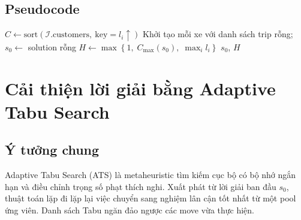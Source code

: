 \documentclass[../DoAn.tex]{subfiles}
\begin{document}
\subsection{Pseudocode}

\begin{algorithm}[H]
\caption{Greedy Insertion --- Xây dựng lời giải ban đầu}
\label{alg:greedy}
$C \leftarrow \mathrm{sort}(\mathcal{I}.\mathrm{customers},\ \mathrm{key} = l_i \uparrow)$\;
Khởi tạo mỗi xe với danh sách trip rỗng; $s_0 \leftarrow$ solution rỗng\;
$H \leftarrow \max\!\left\{1,\; C_{\max}(s_0),\; \max_i l_i\right\}$\;
\Return $s_0$, $H$\;
\end{algorithm}

\section{Cải thiện lời giải bằng Adaptive Tabu Search}

\subsection{Ý tưởng chung}

Adaptive Tabu Search (ATS) là metaheuristic tìm kiếm cục bộ có bộ nhớ ngắn hạn và điều chỉnh trọng số phạt thích nghi. Xuất phát từ lời giải ban đầu $s_0$, thuật toán lặp đi lặp lại việc chuyển sang nghiệm lân cận tốt nhất từ một pool ứng viên. Danh sách Tabu ngăn đảo ngược các move vừa thực hiện.
\end{document}
